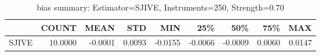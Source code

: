 \begin{table}[ht]
\centering
\caption{bias summary: Estimator=SJIVE, Instruments=250, Strength=0.70}
\begin{tabular}{lrrrrrrrr}
\toprule
 & COUNT & MEAN & STD & MIN & 25\% & 50\% & 75\% & MAX \\
\midrule
SJIVE & 10.0000 & -0.0001 & 0.0093 & -0.0155 & -0.0066 & -0.0009 & 0.0060 & 0.0147 \\
\bottomrule
\end{tabular}
\end{table}
